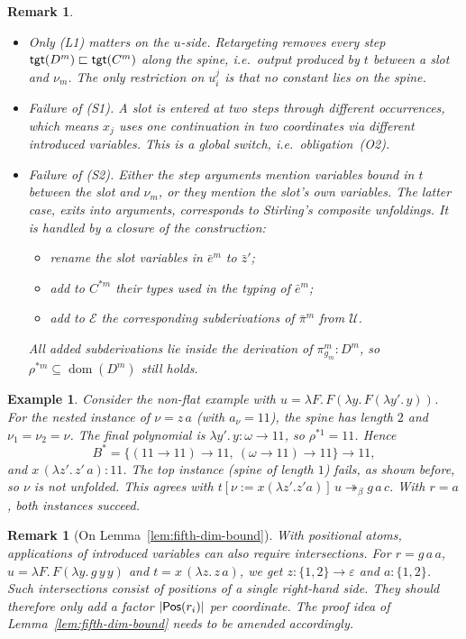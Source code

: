 \documentclass[10pt,a4paper]{article}
\theoremstyle{plain}%
\newtheorem{example}[theorem]{Example}
\newtheorem{remark}[theorem]{Remark}
\DeclareMathOperator{\dom}{dom}
\begin{document}
\begin{remark}
\leavevmode
\begin{itemize}
\item \emph{Only (L1) matters on the $u$-side.}
Retargeting removes every step $\mathsf{tgt}(D^m) \sqsubset \mathsf{tgt}(C^m)$ along the spine, i.e.\ output produced by $t$ between a slot and $\nu_m$.
The only restriction on $u_i^j$ is that no constant lies on the spine.
\item \emph{Failure of (S1).}
A slot is entered at two steps through different occurrences, which means $x_j$ uses one continuation in two coordinates via different introduced variables.
This is a global switch, i.e.\ obligation~(O2).
\item \emph{Failure of (S2).}
Either the step arguments mention variables bound in $t$ between the slot and $\nu_m$, or they mention the slot's own variables.
The latter case, exits into arguments, corresponds to Stirling's composite unfoldings.
It is handled by a closure of the construction:
\begin{itemize}
\item rename the slot variables in $\bar e^m$ to $\bar z'$;
\item add to $C^{*m}$ their types used in the typing of $\bar e^m$;
\item add to $\mathcal{E}$ the corresponding subderivations of $\bar\pi^m$ from $\mathcal{U}$.
\end{itemize}
All added subderivations lie inside the derivation of $\pi^m_{g_m} : D^m$, so $\rho^{*m} \subseteq \dom(D^m)$ still holds.
\end{itemize}
\end{remark}

\begin{example}
Consider the non-flat example with $u = \lambda F.\,F(\lambda y.\,F(\lambda y'.\,y))$.
For the nested instance of $\nu = z\,a$ (with $a_\nu = 11$), the spine has length $2$ and $\nu_1 = \nu_2 = \nu$.
The final polynomial is $\lambda y'.\,y : \omega \to 11$, so $\rho^{*1} = 11$.
Hence
\[
B^* = \{(11 \to 11) \to 11,\ (\omega \to 11) \to 11\} \to 11,
\]
and $x\,(\lambda z'.\,z'\,a) : 11$.
The top instance (spine of length $1$) fails, as shown before, so $\nu$ is not unfolded.
This agrees with $t[\nu := x(\lambda z'.z'a)]\,u \twoheadrightarrow_\beta g\,a\,c$.
With $r = a$, both instances succeed.
\end{example}

\begin{remark}[On Lemma~\ref{lem:fifth-dim-bound}]
With positional atoms, applications of introduced variables can also require intersections.
For $r = g\,a\,a$, $u = \lambda F.\,F(\lambda y.\,g\,y\,y)$ and $t = x\,(\lambda z.\,z\,a)$, we get $z : \{1,2\} \to \varepsilon$ and $a : \{1,2\}$.
Such intersections consist of positions of a single right-hand side.
They should therefore only add a factor $|\mathsf{Pos}(r_i)|$ per coordinate.
The proof idea of Lemma~\ref{lem:fifth-dim-bound} needs to be amended accordingly.
\end{remark}
\end{document}
